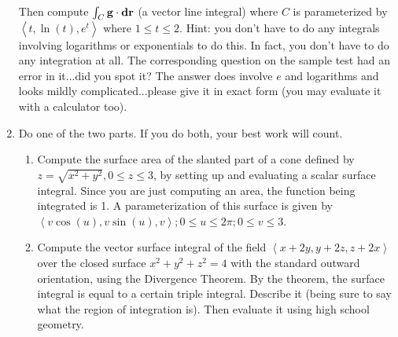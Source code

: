 \documentclass[12pt]{article}
\begin{document}
\begin{enumerate}
\vspace{3 in}

Then compute $\int_C {\bf g \cdot dr}$ (a vector line integral) where $C$ is parameterized by $\left<t,\ln(t),e^t\right>$ where $1 \leq t \leq 2$.  Hint:  you don't have to do any integrals involving logarithms or exponentials to do this.  In fact, you don't have to do any integration at all.  The corresponding question on the sample test had an error in it...did you spot it?  The answer does involve $e$ and logarithms and looks mildly complicated...please give it in exact form (you may evaluate it with a calculator too).

\newpage

\item  Do one of the two  parts.  If you do both, your best work will count.

\begin{enumerate}

\item  Compute the surface area of the slanted part of a cone defined by $z=\sqrt{x^2+y^2}, 0 \leq z \leq 3$, by setting up and evaluating a scalar surface integral.  Since you are just computing an area, the function being integrated is 1.   A parameterization of this surface is given by
$\left<v\cos(u),v\sin(u),v\right>; 0 \leq u \leq 2\pi; 0 \leq v \leq 3$.

\newpage


\item  Compute the vector surface integral of the field $\left<x+2y,y+2z,z+2x\right>$ over the closed surface $x^2+y^2+z^2=4$ with the standard outward orientation, using the Divergence Theorem.  By the theorem, the surface integral is equal to a certain triple integral.  Describe it (being sure to say what the region of integration is).  Then evaluate it using high school geometry.

\end{enumerate}

\newpage




\end{enumerate}
\end{document}
